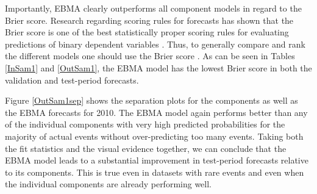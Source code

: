 Importantly, EBMA clearly outperforms all component models in regard
to the Brier score. Research regarding scoring rules for forecasts has
shown that the Brier score is one of the best statistically proper
scoring rules for evaluating predictions of binary dependent variables
\citep{Gneiting_Raftery_2007}.  Thus, to generally compare and rank
the different models one should use the Brier score
\citep{Gneiting_Raftery_2007}. As can be seen in Tables \ref{InSam1}
and \ref{OutSam1}, the EBMA model has the lowest Brier score in both
the validation and test-period forecasts.

Figure \ref{OutSam1sep} shows the separation plots for the components
as well as the EBMA forecasts for 2010.  The EBMA model again performs
better than any of the individual components with very high predicted
probabilities for the majority of actual events without
over-predicting too many events.  Taking both the fit statistics and
the visual evidence together, we can conclude that the EBMA model
leads to a substantial improvement in test-period forecasts relative
to its components.  This is true even in datasets with rare events and
even when the individual components are already performing well.


